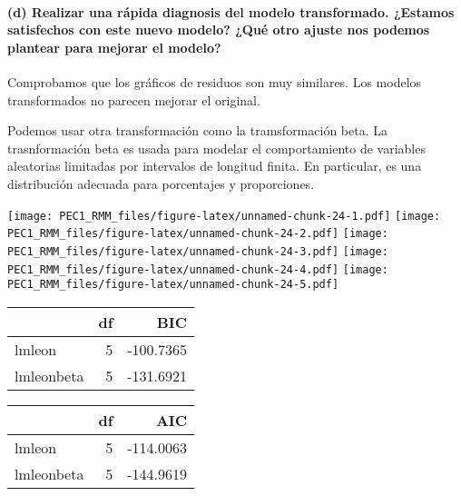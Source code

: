 \documentclass[
]{article}
\begin{document}
\hypertarget{d-realizar-una-ruxe1pida-diagnosis-del-modelo-transformado.-estamos-satisfechos-con-este-nuevo-modelo-quuxe9-otro-ajuste-nos-podemos-plantear-para-mejorar-el-modelo}{%
\paragraph{\texorpdfstring{\textbf{(d) Realizar una rápida diagnosis del
modelo transformado. ¿Estamos satisfechos con este nuevo modelo? ¿Qué
otro ajuste nos podemos plantear para mejorar el
modelo?}}{(d) Realizar una rápida diagnosis del modelo transformado. ¿Estamos satisfechos con este nuevo modelo? ¿Qué otro ajuste nos podemos plantear para mejorar el modelo?}}\label{d-realizar-una-ruxe1pida-diagnosis-del-modelo-transformado.-estamos-satisfechos-con-este-nuevo-modelo-quuxe9-otro-ajuste-nos-podemos-plantear-para-mejorar-el-modelo}}

Comprobamos que los gráficos de residuos son muy similares. Los modelos
transformados no parecen mejorar el original.

Podemos usar otra transformación como la tramsformación beta. La
trasnformación beta es usada para modelar el comportamiento de variables
aleatorias limitadas por intervalos de longitud finita. En particular,
es una distribución adecuada para porcentajes y proporciones.

\texttt{[image: PEC1\_RMM\_files/figure-latex/unnamed-chunk-24-1.pdf]}
\texttt{[image: PEC1\_RMM\_files/figure-latex/unnamed-chunk-24-2.pdf]}
\texttt{[image: PEC1\_RMM\_files/figure-latex/unnamed-chunk-24-3.pdf]}
\texttt{[image: PEC1\_RMM\_files/figure-latex/unnamed-chunk-24-4.pdf]}
\texttt{[image: PEC1\_RMM\_files/figure-latex/unnamed-chunk-24-5.pdf]}

\begin{tabular}{l|r|r}
\hline
  & df & BIC\\
\hline
lmleon & 5 & -100.7365\\
\hline
lmleonbeta & 5 & -131.6921\\
\hline
\end{tabular}

\begin{tabular}{l|r|r}
\hline
  & df & AIC\\
\hline
lmleon & 5 & -114.0063\\
\hline
lmleonbeta & 5 & -144.9619\\
\hline
\end{tabular}
\end{document}
